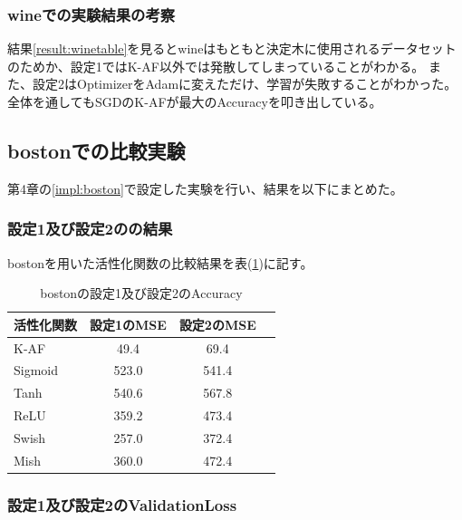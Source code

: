\subsubsection{wineでの実験結果の考察}
結果\ref{result:winetable}を見るとwineはもともと決定木に使用されるデータセットのためか、設定1ではK-AF以外では発散してしまっていることがわかる。
また、設定2はOptimizerをAdamに変えただけ、学習が失敗することがわかった。
全体を通してもSGDのK-AFが最大のAccuracyを叩き出している。







\subsection{bostonでの比較実験}
\label{ev:bostonでの比較実験}

第4章の\ref{impl:boston}で設定した実験を行い、結果を以下にまとめた。
\subsubsection{設定1及び設定2のの結果}

bostonを用いた活性化関数の比較結果を表(\ref{result:bostontable})に記す。


\begin{table}[htbp]
    \begin{center}
        \caption{bostonの設定1及び設定2のAccuracy}
        \label{result:bostontable}
        \vspace{2mm} 
        \begin{tabular}{l*{2}{c}r}
            活性化関数              & 設定1のMSE &  設定2のMSE \\
            \hline
            K-AF            & 49.4 & 69.4 \\
            Sigmoid            & 523.0 & 541.4 \\
            Tanh            & 540.6 &  567.8 \\
            ReLU        & 359.2 & 473.4 \\
            Swish           & 257.0 & 372.4 \\
            Mish           & 360.0 & 472.4 \\
    
        \end{tabular}
    \end{center}
\end{table}


\subsubsection{設定1及び設定2のValidationLoss}
\label{boston:loss}

